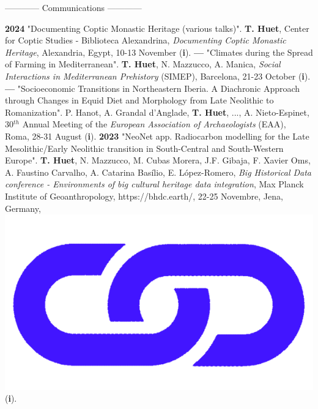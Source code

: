 \documentclass{article}
\newcommand{\fr}[1]{#1}       %
\newcommand{\en}[1]{}     %
\begin{document}
\begin{center}
\fr{------------ Communications ------------}
\en{------------ Talks ------------}
\end{center} 
\textbf{2024 }"Documenting Coptic Monastic Heritage (various talks)". \textbf{T. Huet}, Center for Coptic Studies - Biblioteca Alexandrina, \textit{Documenting Coptic Monastic Heritage}, Alexandria, Egypt, 10-13 November (\textbf{i}).
\smallbreak
\smallbreak
\textbf{--- }"Climates during the Spread of Farming in Mediterranean". \textbf{T. Huet}, N. Mazzucco, A. Manica, \textit{Social Interactions in Mediterranean Prehistory} (SIMEP), Barcelona, 21-23 October (\textbf{i}).
\smallbreak
\textbf{--- }"Socioeconomic Transitions in Northeastern Iberia. A Diachronic Approach through Changes in Equid Diet and Morphology from Late Neolithic to Romanization". P. Hanot, A. Grandal d'Anglade, \textbf{T. Huet}, ..., A. Nieto-Espinet, 30${}^{th}$ Annual Meeting of the \textit{European Association of Archaeologists} (EAA), Roma, 28-31 August (\textbf{i}).
\smallbreak
\textbf{2023 }"NeoNet app. Radiocarbon modelling for the Late Mesolithic/Early Neolithic transition in South-Central and South-Western Europe". \textbf{T. Huet}, N. Mazzucco, M. Cubas Morera, J.F. Gibaja, F. Xavier Oms, A. Faustino Carvalho, A. Catarina Basílio, E. López-Romero, \textit{Big Historical Data conference - Environments of big cultural heritage data integration}, Max Planck Institute of Geoanthropology, https://bhdc.earth/, 22-25 Novembre, Jena, Germany,  \href{https://zoometh.github.io/neonet/doc/talks/2023-bhdc}{\includegraphics[scale=0.015]{link_darkblue.png}} (\textbf{i}).
\smallbreak
\end{document}
